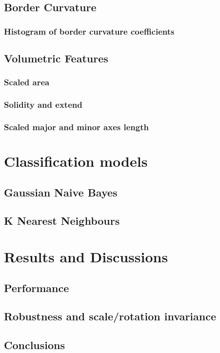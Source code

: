 \documentclass{article}
\begin{document}
\subsection{Border Curvature}
\subsubsection{Histogram of border curvature coefficients}

\subsection{Volumetric Features}
\subsubsection{Scaled area}
\subsubsection{Solidity and extend}
\subsubsection{Scaled major and minor axes length}
 
\section{Classification models}
\subsection{Gaussian Naive Bayes}
\subsection{K Nearest Neighbours}

\section{Results and Discussions}
\subsection{Performance}
\subsection{Robustness and scale/rotation invariance}
\subsection{Conclusions}
\end{document}

